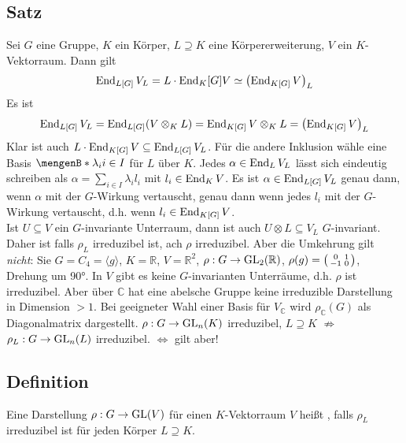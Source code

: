 \subsection{Satz} %
\label{sub:418}
Sei $G$ eine Gruppe, $K$ ein Körper, $L \supseteq K$ eine Körpererweiterung, $V$ ein $K$-Vektorraum. Dann gilt 
\[
	\End_{L[G]} V_L = L \cdot \End_K[G] V \simeq \enbrace*{\End_{K[G]} V}_L 
\]
Es ist 
\begin{align*}
	\End_{L[G]} V_L = \End_{L[G]} \enbrace*{V \otimes_K L} = \End_{K[G]} V \otimes_K L = \enbrace*{\End_{K[G]} V}_L  
\end{align*}
Klar ist auch $L \cdot \End_{K[G]} V \subseteq \End_{L[G]} V_L$. Für die andere Inklusion wähle eine Basis $\set[\lambda_i]{i \in I}$ für $L$ über $K$. Jedes 
$\alpha \in \End_L V_L$ lässt sich eindeutig schreiben als $\alpha = \sum_{i \in I} \lambda_i l_i$ mit $l_i \in \End_K V$. Es ist $\alpha \in \End_{L[G]} V_L$ genau dann,
wenn $\alpha$ mit der $G$-Wirkung vertauscht, genau dann wenn jedes $l_i$ mit der $G$-Wirkung vertauscht, d.h. wenn $l_i \in \End_{K[G]} V$. \bewende\smallskip\\
Ist $U \subseteq V$ ein $G$-invariante Unterraum, dann ist auch $U \otimes L \subseteq V_L$ $G$-invariant. Daher ist falls $\rho_L$ irreduzibel ist, ach $\rho$ irreduzibel.
Aber die Umkehrung gilt \emph{nicht}: 
Sie $G = C_4 = \langle g \rangle$, $K=\mathds{R}$, $V=\mathds{R}^2$, $\rho : G \to \GL_2(\mathds{R})$, $\rho(g) = \begin{psmallmatrix}
	0 & 1 \\
	-1 & 0
\end{psmallmatrix}$, Drehung um 90°. In $V$ gibt es keine $G$-invarianten Unterräume, d.h. $\rho$ ist irreduzibel. Aber über $\mathds{C}$ hat eine abelsche Gruppe keine
irreduzible Darstellung in Dimension $ >1$. Bei geeigneter Wahl einer Basis für $V_\mathds{C}$ wird $\rho_\mathds{C}(G)$ als Diagonalmatrix dargestellt.
$\rho :G \to \GL_n(K)$ irreduzibel, $L \supseteq K$ $\not\Rightarrow$ $\rho_L : G \to \GL_n(L)$ irreduzibel. $\Leftrightarrow$ gilt aber!

\subsection[Definition: Absolut irreduzible Darstellung]{Definition} %
\label{sub:420}
%
Eine Darstellung $\rho : G \to \GL(V)$ für einen $K$-Vektorraum $V$ heißt , falls $\rho_L$ irreduzibel ist für jeden Körper $L \supseteq K$. 


